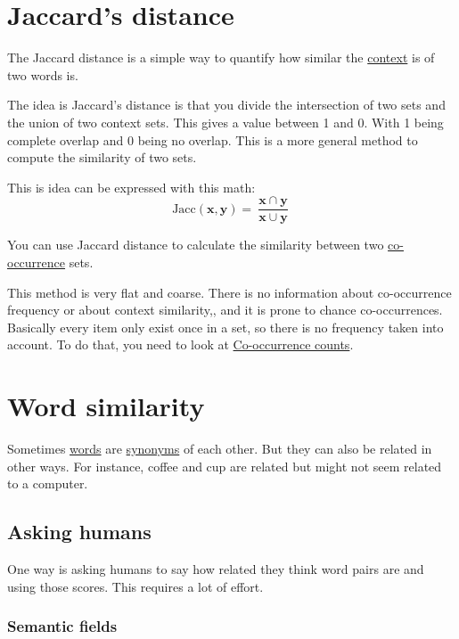 \documentclass[
  11pt,
  british,
]{article}
\begin{document}
\hypertarget{jaccards-distance}{%
\section{Jaccard's distance}\label{jaccards-distance}}

The Jaccard distance is a simple way to quantify how similar the
\href{Context.md}{context} is of two words is.

The idea is Jaccard's distance is that you divide the intersection of
two sets and the union of two context sets. This gives a value between 1
and 0. With 1 being complete overlap and 0 being no overlap. This is a
more general method to compute the similarity of two sets.

This is idea can be expressed with this math:
\[\text{Jacc}(\textbf{x},\textbf{y}) = \frac{\textbf{x}~\cap~\textbf{y}}{\textbf{x}~\cup~\textbf{y}}\]

You can use Jaccard distance to calculate the similarity between two
\href{Co-occurrence.md}{co-occurrence} sets.

This method is very flat and coarse. There is no information about
co-occurrence frequency or about context similarity,, and it is prone to
chance co-occurrences. Basically every item only exist once in a set, so
there is no frequency taken into account. To do that, you need to look
at \href{Co-occurrence.md}{Co-occurrence counts}.

\hypertarget{word-similarity}{%
\section{Word similarity}\label{word-similarity}}

Sometimes \href{../Data/Words.md}{words} are
\href{../Languages/Synonyms.md}{synonyms} of each other. But they can
also be related in other ways. For instance, coffee and cup are related
but might not seem related to a computer.

\hypertarget{asking-humans}{%
\subsection{Asking humans}\label{asking-humans}}

One way is asking humans to say how related they think word pairs are
and using those scores. This requires a lot of effort.

\hypertarget{semantic-fields}{%
\subsubsection{Semantic fields}\label{semantic-fields}}
\end{document}
